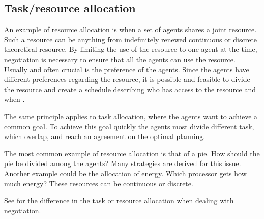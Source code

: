 \subsection{Task/resource allocation}
An example of resource allocation is when a set of agents shares a joint resource. Such a resource can be anything from indefinitely renewed continuous or discrete theoretical resource. By limiting the use of the resource to one agent at the time, negotiation is necessary to ensure that all the agents can use the resource. Usually and often crucial is the preference of the agents. Since the agents have different preferences regarding the resource, it is possible and feasible to divide the resource and create a schedule describing who has access to the resource and when \citep{fatima2014principles}. 

The same principle applies to task allocation, where the agents want to achieve a common goal. To achieve this goal quickly the agents most divide different task, which overlap, and reach an agreement on the optimal planning. 

The most common example of resource allocation is that of a pie. How should the pie be divided among the agents? Many strategies are derived for this issue. Another example could be the allocation of energy. Which processor gets how much energy? These resources can be continuous or discrete.

See  for the difference in the task or resource allocation when dealing with negotiation.

